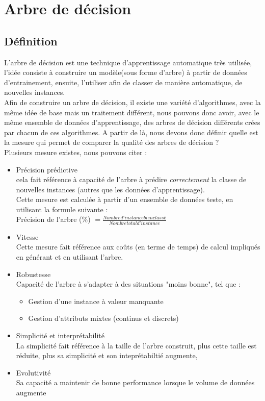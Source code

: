 \documentclass[a4paper, 11pt]{report}
\begin{document}
\section{Arbre de décision}
\subsection{Définition}
L'arbre de décision est une technique d'apprentissage automatique très utilisée, l'idée consiste à construire un modèle(sous forme d'arbre) à partir de données d'entrainement, ensuite, l'utiliser afin de classer de manière automatique, de nouvelles instances. \\
Afin de construire un arbre de décision, il existe une variété d'algorithmes, avec la même idée de base mais un traitement différent, nous pouvons donc avoir, avec le même ensemble de données d'apprentissage, des arbres de décision différents crées par chacun de ces algorithmes. A partir de là, nous devons donc définir quelle est la mesure qui permet de comparer la qualité des arbres de décision ?\\
Plusieurs mesure existes, nous pouvons citer :

\begin{itemize}
\item Précision prédictive \\
cela fait référence à capacité de l'arbre à prédire \emph{correctement} la classe de nouvelles instances (autres que les données d'apprentissage).\\
Cette mesure est calculée à partir d'un ensemble de données teste, en utilisant la formule suivante :\\
Précision de l'arbre (\%) $= \frac{Nombre d'instance bien classé}{Nombre total d'instance}$ 

\item Vitesse\\
Cette mesure fait référence aux coûts (en terme de temps) de calcul impliqués en générant et en utilisant l'arbre.

\item Robustesse \\
Capacité de l'arbre à s'adapter à des situations "moins bonne", tel que :\\
\begin{itemize}
\item Gestion d'une instance à valeur manquante
\item Gestion d'attributs mixtes (continus et discrets)
\end{itemize}


\item Simplicité et interprétabilité \\
La simplicité fait référence à la taille de l'arbre construit, plus cette taille est réduite, plus sa simplicité et son inteprétabiltié augmente, 


\item Evolutivité\\
Sa capacité a maintenir de bonne performance lorsque le volume de données augmente
\end{itemize}
\end{document}
